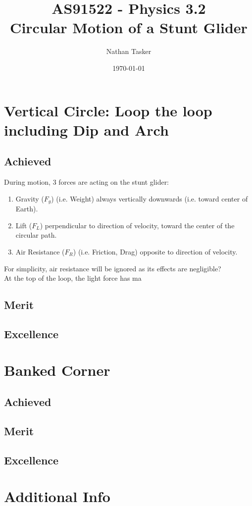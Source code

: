\documentclass[11pt, a4paper]{article}
\title{\small AS91522 - Physics 3.2\\ \huge Circular Motion of a Stunt Glider}
\author{Nathan Tasker}
\date{\today}
\begin{document}
	\maketitle
	\tableofcontents
	\newpage
	\section{Vertical Circle: Loop the loop including Dip and Arch}
	\subsection{Achieved}
	During motion, 3 forces are acting on the stunt glider:
	\begin{enumerate}
		\item Gravity ($F_g$) (i.e. Weight) always vertically downwards (i.e. toward center of Earth).
		\item Lift ($F_L$) perpendicular to direction of velocity, toward the center of the circular path.
		\item Air Resistance ($F_R$) (i.e. Friction, Drag) opposite to direction of velocity.
	\end{enumerate}
	For simplicity, air resistance will be ignored as its effects are negligible?\\
	At the top of the loop, the light force has ma
	\subsection{Merit}
	\subsection{Excellence}
	\section{Banked Corner}
	\subsection{Achieved}
	\subsection{Merit}
	\subsection{Excellence}
	\section{Additional Info}
\end{document}
